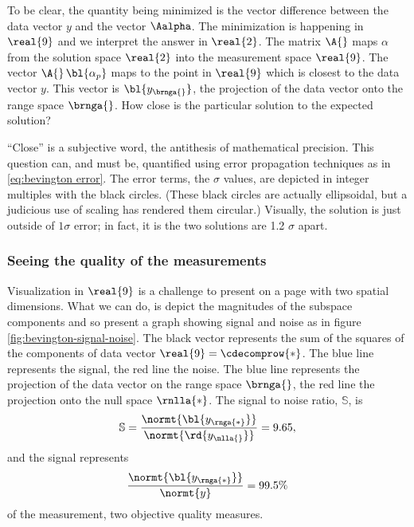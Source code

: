 To be clear, the quantity being minimized is the vector difference between the data vector $y$ and the vector $\Aalpha$. The minimization is happening in $\real{9}$ and we interpret the answer in $\real{2}$. The matrix $\A{}$ maps $\alpha$ from the solution space $\real{2}$ into the measurement space $\real{9}$. The vector $\A{}\,\bl{\alpha_{p}}$ maps to the point in $\real{9}$ which is closest to the data vector $y$. This vector is $\bl{y_{\brnga{}}}$, the projection of the data vector onto the range space $\brnga{}$. How close is the particular solution to the expected solution?

``Close'' is a subjective word, the antithesis of mathematical precision. This question can, and must be, quantified using error propagation techniques as in \eqref{eq:bevington error}. The error terms, the $\sigma$ values, are depicted in integer multiples with the black circles. (These black circles are actually ellipsoidal, but a judicious use of scaling has rendered them circular.) Visually, the solution is just outside of $1\sigma$ error; in fact, it is the two solutions are 1.2 $\sigma$ apart.

\subsubsection{\label{sec:Seeing the quality of the measurements}Seeing the quality of the measurements} 

Visualization in $\real{9}$ is a challenge to present on a page with two spatial dimensions. What we can do, is depict the magnitudes of the subspace components and so present a graph showing signal and noise as in figure \ref{fig:bevington-signal-noise}. The black vector represents the sum of the squares of the components of data vector $\real{9} = \cdecomprow{*}$. The blue line represents the signal, the red line the noise. The blue line represents the projection of the data vector on the range space $\brnga{}$, the red line the projection onto the null space $\rnlla{*}$. The signal to noise ratio, $\mathbb{S}$, is
%
\begin{equation}
	\mathbb{S}= \frac{ \normt{ \bl{ y_{\rnga{*}} } } } { \normt{ \rd{ y_{\nlla{}} } } } = 9.65,
\label{eq:bevington snr}
\end{equation}
%
and the signal represents 
$$\frac{ \normt{ \bl{ y_{\rnga{*}} } } } { \normt{ y } } = 99.5\%$$
of the measurement, two objective quality measures.


